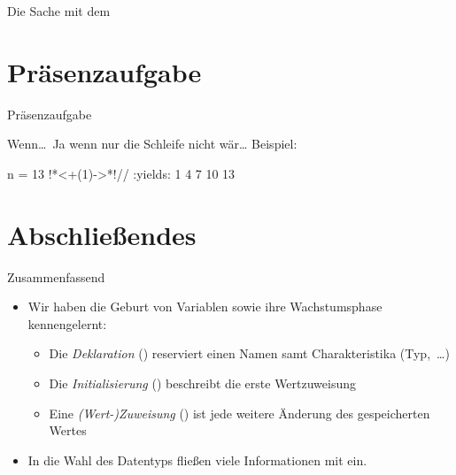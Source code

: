 \begin{frame}{Die Sache mit dem }
\end{frame}

\section{Präsenzaufgabe}
\begin{frame}[fragile,c]{Präsenzaufgabe}
\begin{aufgabe}{Wenn\ldots\ Ja wenn nur die Schleife nicht wär\ldots}
     
    Beispiel:
\begin{plainjava}
n = 13 !*\onslide<+(1)->*!// :yields: 1 4 7 10 13
\end{plainjava}
\end{aufgabe}
\end{frame}

\begin{frame}{}

\end{frame}

\section{Abschließendes}
{\SummaryFrame
\begin{frame}[t]{Zusammenfassend}
\pause \printBibCommand
\vfill\vfill %
\begin{itemize}[<+(1)->]
    \itemsep14pt
    \item Wir haben die Geburt von Variablen sowie ihre Wachstumsphase kennengelernt: \begin{itemize}
        \item Die \textit{Deklaration} () reserviert einen Namen samt Charakteristika (Typ,~\ldots)
        \item Die \textit{Initialisierung} () beschreibt die erste Wertzuweisung
        \item Eine \textit{(Wert-)Zuweisung} () ist jede weitere Änderung des gespeicherten Wertes
    \end{itemize}
    \item In die Wahl des  Datentyps fließen viele Informationen mit ein.
\end{itemize}
\end{frame}
}

\outro{\vskip6mm\centering\begin{tikzpicture}[scale=2.5]
\end{tikzpicture}}


\iffull\fi
